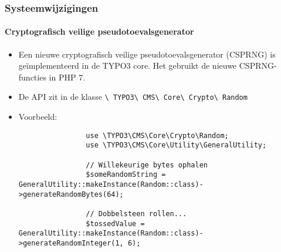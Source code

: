 \begin{frame}[fragile]
	\frametitle{Systeemwijzigingen}
	\framesubtitle{Cryptografisch veilige pseudotoevalsgenerator}

	\lstset{basicstyle=\tiny\ttfamily}

	\begin{itemize}

		\item Een nieuwe cryptografisch veilige pseudotoevalsgenerator (CSPRNG) is
			geïmplementeerd in de TYPO3 core.\newline
			Het gebruikt de nieuwe CSPRNG-functies in PHP 7.

		\item De API zit in de klasse
			\texttt{\textbackslash
				TYPO3\textbackslash
				CMS\textbackslash
				Core\textbackslash
				Crypto\textbackslash
				Random}

		\item Voorbeeld:

			\begin{lstlisting}
				use \TYPO3\CMS\Core\Crypto\Random;
				use \TYPO3\CMS\Core\Utility\GeneralUtility;

				// Willekeurige bytes ophalen
				$someRandomString = GeneralUtility::makeInstance(Random::class)->generateRandomBytes(64);

				// Dobbelsteen rollen...
				$tossedValue = GeneralUtility::makeInstance(Random::class)->generateRandomInteger(1, 6);
			\end{lstlisting}

	\end{itemize}

\end{frame}


